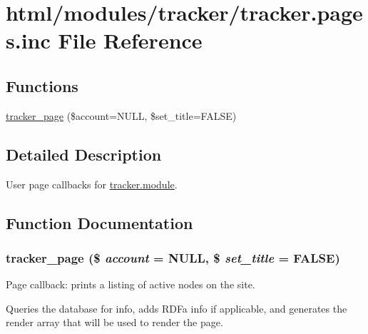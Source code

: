 \hypertarget{tracker_8pages_8inc}{
\section{html/modules/tracker/tracker.pages.inc File Reference}
\label{tracker_8pages_8inc}
}
\subsection*{Functions}
\begin{DoxyCompactItemize}
\item 
\hyperlink{tracker_8pages_8inc_a7ba726633c43324ec58dd1aa4ec999e4}{tracker\_\-page} (\$account=NULL, \$set\_\-title=FALSE)
\end{DoxyCompactItemize}


\subsection{Detailed Description}
User page callbacks for \hyperlink{tracker_8module}{tracker.module}. 

\subsection{Function Documentation}
\hypertarget{tracker_8pages_8inc_a7ba726633c43324ec58dd1aa4ec999e4}{
\subsubsection[{tracker\_\-page}]{\setlength{\rightskip}{0pt plus 5cm}tracker\_\-page (\$ {\em account} = {\ttfamily NULL}, \/  \$ {\em set\_\-title} = {\ttfamily FALSE})}}
\label{tracker_8pages_8inc_a7ba726633c43324ec58dd1aa4ec999e4}
Page callback: prints a listing of active nodes on the site.

Queries the database for info, adds RDFa info if applicable, and generates the render array that will be used to render the page. 